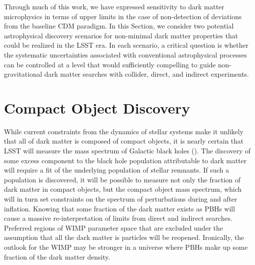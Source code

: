 
Through much of this work, we have expressed sensitivity to dark matter microphysics in terms of upper limits in the case of non-detection of deviations from the baseline CDM paradigm.
In this Section, we consider two potential astrophysical discovery scenarios for non-minimal dark matter properties that could be realized in the LSST era.
In each scenario, a critical question is whether the systematic uncertainties associated with conventional astrophysical processes can be controlled at a level that would sufficiently compelling to guide non-gravitational dark matter searches with collider, direct, and indirect experiments.

\section{Compact Object Discovery}

While current constraints from the dynamics of stellar systems make it unlikely that all of dark matter is composed of compact objects, it is nearly certain that LSST will measure the mass spectrum of Galactic black holes ().
The discovery of some excess component to the black hole population attributable to dark matter will require a fit of the underlying population of stellar remnants.
If such a population is discovered, it will be possible to measure not only the fraction of dark matter in compact objects, but the compact object mass spectrum, which will in turn set constraints on the spectrum of perturbations during and after inflation.
Knowing that some fraction of the dark matter exists as PBHs will cause a massive re-interpretation of limits from direct and indirect searches.
Preferred regions of WIMP parameter space that are excluded under the assumption that all the dark matter is particles will be reopened.
Ironically, the outlook for the WIMP may be stronger in a universe where PBHs make up some fraction of the dark matter density.

